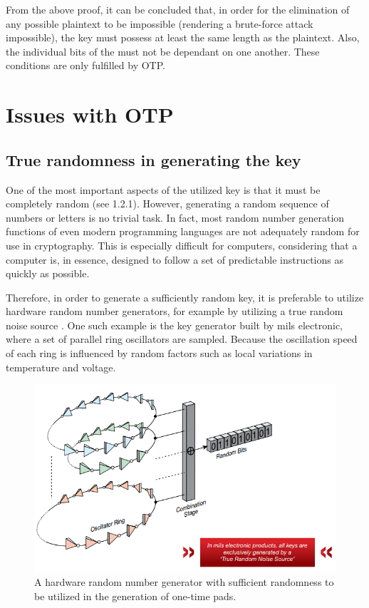 \documentclass[12pt]{report}
\begin{document}
From the above proof, it can be concluded that, in order for the elimination of any possible plaintext to be impossible (rendering a brute-force attack impossible), the key must possess at least the same length as the plaintext. Also, the individual bits of the must not be dependant on one another. These conditions are only fulfilled by OTP.  

\section{Issues with OTP}
\subsection{True randomness in generating the key}
One of the most important aspects of the utilized key is that it must be completely random (see 1.2.1). However, generating a random sequence of numbers or letters is no trivial task. In fact, most random number generation functions of even modern programming languages are not adequately random for use in cryptography. This is especially difficult for computers, considering that a computer is, in essence, designed to follow a set of predictable instructions as quickly as possible.

Therefore, in order to generate a sufficiently random key, it is preferable to utilize hardware random number generators, for example by utilizing a true random noise source \cite{MilsElectronic}. One such example is the key generator built by mils electronic, where a set of parallel ring oscillators are sampled. Because the oscillation speed of each ring is influenced by random factors such as local variations in temperature and voltage.

\begin{figure}[H]
\centering
\includegraphics[scale=0.75]{MilsElectronic.PNG}
\caption{A hardware random number generator with sufficient randomness to be utilized in the generation of one-time pads.}
\end{figure}
\end{document}
